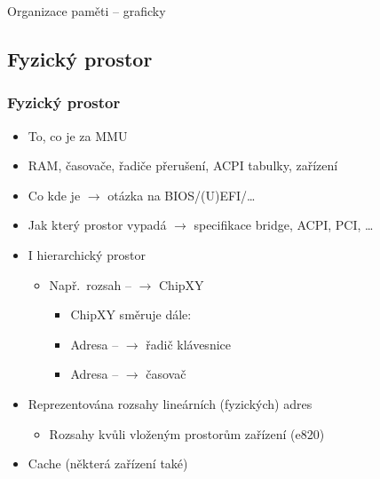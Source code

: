 \begin{frame}{Organizace paměti -- graficky}

  \begin{center}
    
  \end{center}

\end{frame}

\iffimuni
\subsection{Fyzický prostor}
\fi

\begin{frame}
  \frametitle{Fyzický prostor}

  \begin{itemize}
    \item To, co je za MMU
    \item RAM, časovače, řadiče přerušení, ACPI tabulky, zařízení

    \pause

    \item Co kde je $\rightarrow$ otázka na BIOS/(U)EFI/\dots

    \pause

    \item Jak který prostor vypadá $\rightarrow$ specifikace bridge, ACPI, PCI,
      \ldots

    \pause

    \item I hierarchický prostor
    \begin{itemize}
    \item Např.\ rozsah -- $\rightarrow$ ChipXY
      \begin{itemize}
      \item ChipXY směruje dále:
      \item Adresa -- $\rightarrow$ řadič klávesnice
      \item Adresa -- $\rightarrow$ časovač
      \end{itemize}
    \end{itemize}
  \end{itemize}

  \pause

  \begin{itemize}
    \item Reprezentována rozsahy lineárních (fyzických) adres
    \begin{itemize}
      \item Rozsahy kvůli vloženým prostorům zařízení (e820)
    \end{itemize}
    \item Cache (některá zařízení také)
  \end{itemize}

\end{frame}

